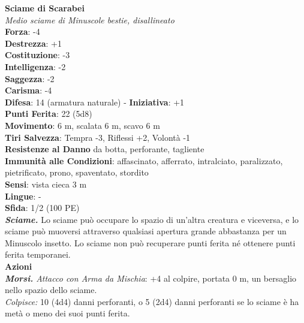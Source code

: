 \begin{multicols}{2}
\medskip\textbf{Sciame di Scarabei}\\
\emph{Medio sciame di Minuscole bestie, disallineato}\\
\textbf{Forza}: -4\\
\textbf{Destrezza}: +1\\
\textbf{Costituzione}: -3\\
\textbf{Intelligenza}: -2\\
\textbf{Saggezza}: -2\\
\textbf{Carisma}: -4\\
\textbf{Difesa}: 14 (armatura naturale) - \textbf{Iniziativa}: +1\\
\textbf{Punti Ferita}: 22 (5d8)\\
\textbf{Movimento}: 6 m, scalata 6 m, scavo 6 m\\
\textbf{Tiri Salvezza}: Tempra -3, Riflessi +2, Volontà -1\\
\textbf{Resistenze al Danno} da botta, perforante, tagliente\\
\textbf{Immunità alle Condizioni}: affascinato, afferrato, intralciato, paralizzato, pietrificato, prono, spaventato, stordito\\
\textbf{Sensi}: vista cieca 3 m\\
\textbf{Lingue}: -\\
\textbf{Sfida}: 1/2 (100 PE)\smallskip\\
\emph{\textbf{Sciame.}} Lo sciame può occupare lo spazio di un'altra creatura e viceversa, e lo sciame può muoversi attraverso qualsiasi apertura grande abbastanza per un Minuscolo insetto. Lo sciame non può recuperare punti ferita né ottenere punti ferita temporanei.\\
\smallskip\textbf{Azioni}\\
\emph{\textbf{Morsi.} Attacco con Arma da Mischia}: +4 al colpire, portata 0 m, un bersaglio nello spazio dello sciame.\\
\emph{Colpisce:} 10 (4d4) danni perforanti, o 5 (2d4) danni perforanti se lo sciame è ha metà o meno dei suoi punti ferita.\\


\end{multicols}
